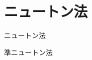 \section{ニュートン法}

\begin{frame}[t,fragile]{ニュートン法}
\end{frame}

\begin{frame}[t,fragile]{準ニュートン法}
\end{frame}
